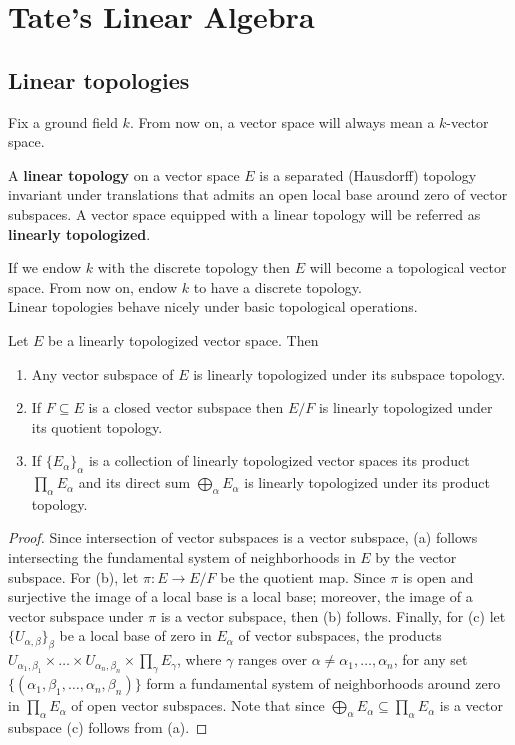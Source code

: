 \chapter{Tate's Linear Algebra}\label{ch:tate-linear-algebra}
\section{Linear topologies}
Fix a ground field $k$. From now on, a vector space will always mean a $k$-vector space.
\begin{definition}\label{linear_topology}
A \textbf{linear topology} on a vector space $E$ is a separated (Hausdorff) topology invariant under translations that admits an open local base around zero of vector subspaces. A vector space equipped with a linear topology will be referred as \textbf{linearly topologized}.
\end{definition}
If we endow $k$ with the discrete topology then $E$ will become a topological vector space. From now on, endow $k$ to have a discrete topology. \\
Linear topologies behave nicely under basic topological operations.
\begin{proposition}\label{linear_topologies_properties}
Let $E$ be a linearly topologized vector space. Then
	\begin{enumerate}[label = (\alph*)]
		\item Any vector subspace of $E$ is linearly topologized under its subspace topology.
		\item If $F \subseteq E$ is a closed vector subspace then $E/F$ is linearly topologized under its quotient topology.
		\item If $\{E_{\alpha}\}_{\alpha}$ is a collection of linearly topologized vector spaces its product $\prod_{\alpha} E_{\alpha}$ and its direct sum $\bigoplus_{\alpha} E_{\alpha}$ is linearly topologized under its product topology.
	\end{enumerate}
\end{proposition}
\begin{proof}
	Since intersection of vector subspaces is a vector subspace, (a) follows intersecting the fundamental system of neighborhoods in $E$ by the vector subspace. For (b), let $\pi\colon E \to E/F$ be the quotient map. Since $\pi$ is open and surjective the image of a local base is a local base; moreover, the image of a vector subspace under $\pi$ is a vector subspace, then (b) follows. Finally, for (c) let $\{U_{\alpha, \beta}\}_{\beta}$ be a local base of zero in $E_{\alpha}$ of vector subspaces, the products $U_{\alpha_{1}, \beta_{1}} \times \ldots \times U_{\alpha_{n}, \beta_{n}} \times \prod_{\gamma} E_{\gamma}$, where $\gamma$ ranges over $\alpha \neq \alpha_{1}, \ldots, \alpha_{n}$, for any set $\{(\alpha_{1}, \beta_{1}, \ldots, \alpha_{n}, \beta_{n})\}$ form a fundamental system of neighborhoods around zero in $\prod_{\alpha} E_{\alpha}$ of open vector subspaces. Note that since $\bigoplus_{\alpha} E_{\alpha} \subseteq \prod_{\alpha} E_{\alpha}$ is a vector subspace (c) follows from (a). 
\end{proof}
